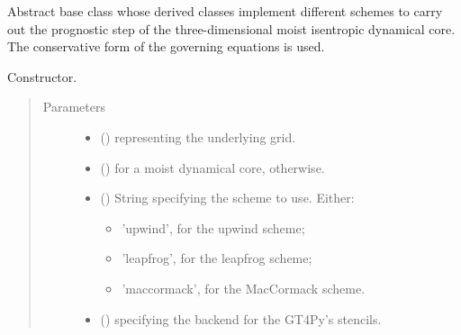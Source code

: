 \documentclass[letterpaper,10pt,english]{sphinxmanual}
\begin{document}
\begin{fulllineitems}
\label{\detokenize{api:dycore.prognostic_isentropic.PrognosticIsentropic}}
Abstract base class whose derived classes implement different schemes to carry out the prognostic step of
the three-dimensional moist isentropic dynamical core. The conservative form of the governing equations is used.

\begin{fulllineitems}
\label{\detokenize{api:dycore.prognostic_isentropic.PrognosticIsentropic.__init__}}
Constructor.
\begin{quote}\begin{description}
\item[{Parameters}] \leavevmode\begin{itemize}
\item {} 
 () \textendash{} {\hyperref[\detokenize{api:grids.grid_xyz.GridXYZ}]{}} representing the underlying grid.

\item {} 
 () \textendash{}  for a moist dynamical core,  otherwise.

\item {} 
 () \textendash{} 
String specifying the scheme to use. Either:
\begin{itemize}
\item {} 
’upwind’, for the upwind scheme;

\item {} 
’leapfrog’, for the leapfrog scheme;

\item {} 
’maccormack’, for the MacCormack scheme.

\end{itemize}


\item {} 
 () \textendash{}  specifying the backend for the GT4Py’s stencils.


\end{itemize}
\end{description}
\end{quote}
\end{fulllineitems}
\end{fulllineitems}
\end{document}
